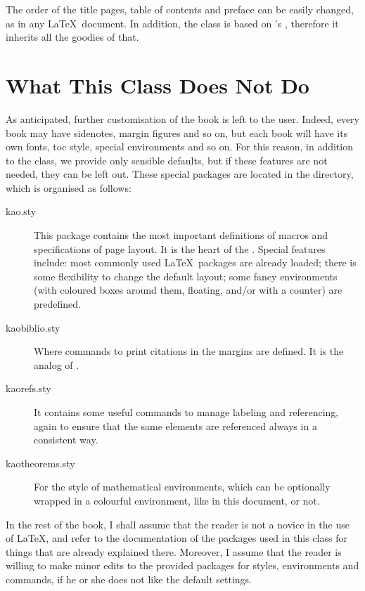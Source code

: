 The order of the title pages, table of contents and preface can be 
easily changed, as in any \LaTeX\ document. In addition, the class is 
based on \KOMAScript's , therefore it inherits all the 
goodies of that.

\section{What This Class Does Not Do}
\label{doesnot}

As anticipated, further customisation of the book is left to the user. 
Indeed, every book may have sidenotes, margin figures and so on, but 
each book will have its own fonts, toc style, special environments and 
so on. For this reason, in addition to the class, we provide only 
sensible defaults, but if these features are not needed, they can be 
left out. These special packages are located in the  
directory, which is organised as follows:

\begin{description}
	\item[kao.sty] This package contains the most important definitions 
    of macros and specifications of page layout. It is the heart of the 
    . Special features include: most commonly used 
    \LaTeX\ packages are already loaded; there is some flexibility to 
    change the default layout; some fancy environments (with coloured 
    boxes around them, floating, and/or with a counter) are predefined.
    \item[kaobiblio.sty] Where commands to print citations in the 
    margins are defined. It is the 
     analog of .
    \item[kaorefs.sty] It contains some useful commands to manage 
    labeling and referencing, again to ensure that the same elements are 
    referenced always in a consistent way.
    \item[kaotheorems.sty] For the style of mathematical environments, 
    which can be optionally wrapped in a colourful  
    environment, like in this document, or not.
    \end{description}


In the rest of the book, I shall assume that the reader is not a novice 
in the use of \LaTeX, and refer to the documentation of the packages 
used in this class for things that are already explained there. 
Moreover, I assume that the reader is willing to make minor edits to the 
provided packages for styles, environments and commands, if he or she 
does not like the default settings.

